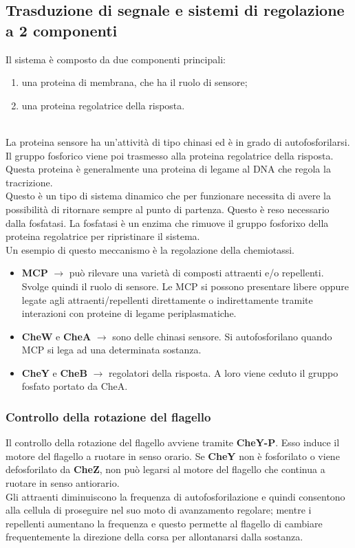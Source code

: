 \subsection{Trasduzione di segnale e sistemi di regolazione a 2 componenti}
Il sistema è composto da due componenti principali:
\begin{enumerate}
    \item una proteina di membrana, che ha il ruolo di sensore;
    \item una proteina regolatrice della risposta. 
\end{enumerate}
\\La proteina sensore ha un'attività di tipo chinasi ed è in grado di autofosforilarsi. Il gruppo fosforico viene poi trasmesso alla proteina regolatrice della risposta. Questa proteina è generalmente una proteina di legame al DNA che regola la tracrizione. 
\\Questo è un tipo di sistema dinamico che per funzionare necessita di avere la possibilità di ritornare sempre al punto di partenza. Questo è reso necessario dalla fosfatasi. La fosfatasi è un enzima che rimuove il gruppo fosforixo della proteina regolatrice per ripristinare il sistema.
\\Un esempio di questo meccanismo è la regolazione della chemiotassi.
\begin{itemize}
    \item \textbf{MCP} $\xrightarrow{}$ può rilevare una varietà di composti attraenti e/o repellenti. Svolge quindi il ruolo di sensore. Le MCP si possono presentare libere oppure legate agli attraenti/repellenti direttamente o indirettamente tramite interazioni con proteine di legame periplasmatiche. 
    \item \textbf{CheW} e \textbf{CheA} $\xrightarrow{}$ sono delle chinasi sensore. Si autofosforilano quando MCP si lega ad una determinata sostanza. 
    \item \textbf{CheY} e \textbf{CheB} $\xrightarrow{}$ regolatori della risposta. A loro viene ceduto il gruppo fosfato portato da CheA. 
\end{itemize}
\subsubsection{Controllo della rotazione del flagello}
Il controllo della rotazione del flagello avviene tramite \textbf{CheY-P}. Esso induce il motore del flagello a ruotare in senso orario. Se \textbf{CheY} non è fosforilato o viene defosforilato da \textbf{CheZ}, non può legarsi al motore del flagello che continua a ruotare in senso antiorario. 
\\Gli attraenti diminuiscono la frequenza di autofosforilazione e quindi consentono alla cellula di proseguire nel suo moto di avanzamento regolare; mentre i repellenti aumentano la frequenza e questo permette al flagello di cambiare frequentemente la direzione della corsa per allontanarsi dalla sostanza. 
